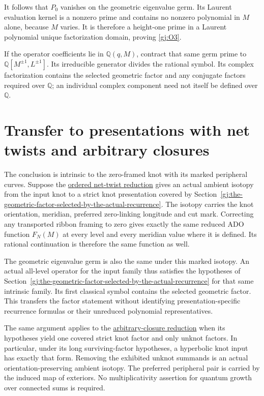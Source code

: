 It follows that \(P_0\) vanishes on the geometric eigenvalue germ.
Its Laurent evaluation kernel is a nonzero prime and contains no
nonzero polynomial in \(M\) alone, because \(M\) varies. It is
therefore a height-one prime in a Laurent polynomial unique
factorization domain, proving \eqref{gj:O3}.

If the operator coefficients lie in \(\mathbb Q(q,M)\), contract
that same germ prime to \(\mathbb Q[M^{\pm1},L^{\pm1}]\). Its
irreducible generator divides the rational symbol. Its complex
factorization contains the selected geometric factor and any
conjugate factors required over \(\mathbb Q\); an individual complex
component need not itself be defined over \(\mathbb Q\).

\section{Transfer to presentations with net twists and arbitrary closures}\label{gj:transfer-to-presentations-with-net-twists-and-arbitrary-closures}

The conclusion is intrinsic to the zero-framed knot with its marked
peripheral curves. Suppose the
\href{https://sashakolpakov.github.io/murakamis_dream/notes/actual_conway_net_twist_volume.html}{ordered net-twist reduction} gives
an actual ambient isotopy from the input knot to a strict knot
presentation covered by Section~\ref{gj:the-geometric-factor-selected-by-the-actual-recurrence}. The isotopy carries the knot
orientation, meridian, preferred zero-linking longitude and cut mark.
Correcting any transported ribbon framing to zero gives exactly the
same reduced ADO function \(F_N(M)\) at every level and every
meridian value where it is defined. Its rational continuation is
therefore the same function as well.

The geometric eigenvalue germ is also the same under this marked
isotopy. An actual all-level operator for the input family thus
satisfies the hypotheses of Section~\ref{gj:the-geometric-factor-selected-by-the-actual-recurrence} for that same intrinsic
family. Its first classical symbol contains the selected geometric
factor. This transfers the factor statement without identifying
presentation-specific recurrence formulas or their unreduced
polynomial representatives.

The same argument applies to the
\href{https://sashakolpakov.github.io/murakamis_dream/notes/actual_conway_arbitrary_closure_volume.html}{arbitrary-closure reduction}
when its hypotheses yield one covered strict knot factor and only
unknot factors. In particular, under its long surviving-factor
hypotheses, a hyperbolic knot input has exactly that form. Removing
the exhibited unknot summands is an actual orientation-preserving
ambient isotopy. The preferred peripheral pair is carried by the
induced map of exteriors. No multiplicativity assertion for quantum
growth over connected sums is required.

